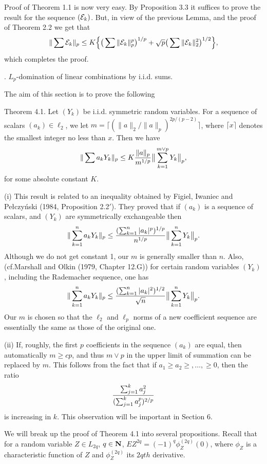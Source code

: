 \bigskip\noindent Proof of Theorem 1.1 is now very easy. By Proposition 3.3
it suffices to prove the result for the sequence $({\cal E}_k)$. But, in
view of the previous Lemma, and the proof of Theorem 2.2 we get that
$$\|\sum
{\cal E}_k\|_p\le K\Big\{\big(\sum\|{\cal E}_k\|_p^p\big)^{1/p}+\sqrt
p\big(\sum\|{\cal
E}_k\|_2^2\big)^{1/2}\Big\},$$ which completes the proof.

. $L_p$-domination of linear combinations by i.i.d. sums.

The aim of this section is to prove the following

\proclaim Theorem 4.1. Let $(Y_k)$ be i.i.d. symmetric random variables.
For a sequence of scalars $(a_k)\in \ell_2$, we let
$m=\lceil(\|a\|_2/\|a\|_p)^{2p/(p-2)}\rceil$, where $\lceil x\rceil$
denotes the smallest integer no less than $x$. Then we have $$ \|\sum
a_kY_k\|_p\le K{\|a\|_p\over
m^{1/p}}\big\|\sum_{k=1}^{m\vee p}Y_k\big\|_p, $$ for some absolute
constant $K$.

 \item{(i)} This result is related to an inequality
obtained by Figiel, Iwaniec and Pe\l czy\'nski (1984, Proposition 2.2$'$).
They proved that if $(a_k)$ is a sequence of scalars, and $(Y_k)$ are
symmetrically exchangeable then $$
\|\sum_{k=1}^n a_kY_k\|_p\le {(\sum_{k=1}^n|a_k|^p)^{1/p}\over
n^{1/p}}\big\|\sum_{k=1}^nY_k\big\|_p.
$$
Although we do not get constant 1, our $m$ is generally smaller than $n$.
Also, (cf.Marshall and Olkin (1979, Chapter 12.G)) for certain random
variables $(Y_k)$, including the Rademacher sequence, one has $$
\|\sum_{k=1}^n
a_kY_k\|_p\le {(\sum_{k=1}^n|a_k|^2)^{1/2}\over \sqrt
n}\big\|\sum_{k=1}^nY_k\big\|_p.
$$
Our $m$ is chosen so that the $\ell_2$ and $\ell_p$ norms of a new
coefficient sequence are essentially the same as those of the original one.



\item{(ii)} If, roughly, the first $p$ coefficients in the sequence $(a_k)$
are equal, then automatically $m\ge cp$, and thus $m\vee p$ in the upper
limit of summation can be replaced by $m$. This follows from the fact that
if $a_1\ge a_2\ge,\dots,\ge 0$, then the ratio $$
{\sum_{j=1}^ka_j^2\over(\sum_{j=1}^ka_j^p)^{2/p}} $$ is increasing in $k$.
This observation will be important in Section 6.

\bs

\n We will break up the proof of Theorem 4.1 into several propositions.
Recall that for a random variable $Z\in L_{2q}$, $q\in {\bf N}$,
$EZ^{2q}=(-1)^q\phi_Z^{(2q)}(0)$, where $\phi_Z$ is a characteristic
function of $Z$ and $\phi_Z^{(2q)}$ its $2qth$ derivative.


